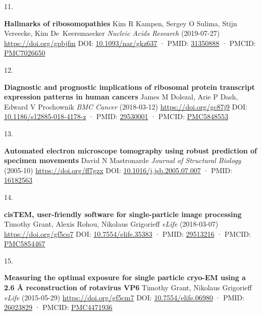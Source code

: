 \documentclass[
]{article}
\newlength{\cslhangindent}
\newlength{\csllabelwidth}
\newlength{\cslentryspacingunit} %
\newenvironment{CSLReferences}[2] %
 {%
  \setlength{\parindent}{0pt}
  \ifodd #1
  \let\oldpar\par
  \def\par{\hangindent=\cslhangindent\oldpar}
  \fi
  \setlength{\parskip}{#2\cslentryspacingunit}
 }%
 {}
\newcommand{\CSLBlock}[1]{#1\hfill\break}
\newcommand{\CSLLeftMargin}[1]{\parbox[t]{\csllabelwidth}{#1}}
\newcommand{\CSLRightInline}[1]{\parbox[t]{\linewidth - \csllabelwidth}{#1}\break}
\begin{document}
\begin{CSLReferences}{0}{0}
\leavevmode{}%
\CSLLeftMargin{11. }%
\CSLRightInline{\textbf{Hallmarks of ribosomopathies}
\CSLBlock{Kim R Kampen, Sergey O Sulima, Stijn Vereecke, Kim De~Keersmaecker} \emph{Nucleic Acids Research} (2019-07-27) \url{https://doi.org/gpbjfm}
\CSLBlock{DOI: \href{https://doi.org/10.1093/nar/gkz637}{10.1093/nar/gkz637} · PMID: \href{https://www.ncbi.nlm.nih.gov/pubmed/31350888}{31350888} · PMCID: \href{https://www.ncbi.nlm.nih.gov/pmc/articles/PMC7026650}{PMC7026650}}}

\leavevmode{}%
\CSLLeftMargin{12. }%
\CSLRightInline{\textbf{Diagnostic and prognostic implications of ribosomal protein transcript expression patterns in human cancers}
\CSLBlock{James M Dolezal, Arie P Dash, Edward V Prochownik} \emph{BMC Cancer} (2018-03-12) \url{https://doi.org/gc87j9}
\CSLBlock{DOI: \href{https://doi.org/10.1186/s12885-018-4178-z}{10.1186/s12885-018-4178-z} · PMID: \href{https://www.ncbi.nlm.nih.gov/pubmed/29530001}{29530001} · PMCID: \href{https://www.ncbi.nlm.nih.gov/pmc/articles/PMC5848553}{PMC5848553}}}

\leavevmode{}%
\CSLLeftMargin{13. }%
\CSLRightInline{\textbf{Automated electron microscope tomography using robust prediction of specimen movements}
\CSLBlock{David N Mastronarde} \emph{Journal of Structural Biology} (2005-10) \url{https://doi.org/ff7gzx}
\CSLBlock{DOI: \href{https://doi.org/10.1016/j.jsb.2005.07.007}{10.1016/j.jsb.2005.07.007} · PMID: \href{https://www.ncbi.nlm.nih.gov/pubmed/16182563}{16182563}}}

\leavevmode{}%
\CSLLeftMargin{14. }%
\CSLRightInline{\textbf{cisTEM, user-friendly software for single-particle image processing}
\CSLBlock{Timothy Grant, Alexis Rohou, Nikolaus Grigorieff} \emph{eLife} (2018-03-07) \url{https://doi.org/gf5cq7}
\CSLBlock{DOI: \href{https://doi.org/10.7554/elife.35383}{10.7554/elife.35383} · PMID: \href{https://www.ncbi.nlm.nih.gov/pubmed/29513216}{29513216} · PMCID: \href{https://www.ncbi.nlm.nih.gov/pmc/articles/PMC5854467}{PMC5854467}}}

\leavevmode{}%
\CSLLeftMargin{15. }%
\CSLRightInline{\textbf{Measuring the optimal exposure for single particle cryo-EM using a 2.6 Å reconstruction of rotavirus VP6}
\CSLBlock{Timothy Grant, Nikolaus Grigorieff} \emph{eLife} (2015-05-29) \url{https://doi.org/gf5cm7}
\CSLBlock{DOI: \href{https://doi.org/10.7554/elife.06980}{10.7554/elife.06980} · PMID: \href{https://www.ncbi.nlm.nih.gov/pubmed/26023829}{26023829} · PMCID: \href{https://www.ncbi.nlm.nih.gov/pmc/articles/PMC4471936}{PMC4471936}}}


\end{CSLReferences}
\end{document}
